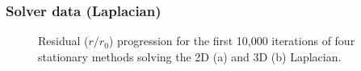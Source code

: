 \documentclass{beamer}
\begin{document}
\begin{frame}
	\frametitle{Solver data (Laplacian)}
	\begin{figure}[H]
		\centering
		\caption{Residual ($r / r_0$) progression for the first 10,000 iterations of four stationary methods solving the 2D (a) and 3D (b) Laplacian.}
	\end{figure}
\end{frame}

\end{document}
